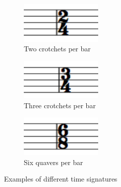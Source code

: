 \begin{figure}[h!]
    \begin{subfigure}[b]{.3\linewidth}
        \centering
        \includegraphics[height=2cm]{gfx/music-theory/time-signature-2-4.png}
        \caption{Two crotchets per bar}
    \end{subfigure}
    \begin{subfigure}[b]{.3\linewidth}
        \centering
        \includegraphics[height=2cm]{gfx/music-theory/time-signature-3-4.png}
        \caption{Three crotchets per bar}
    \end{subfigure}
    \begin{subfigure}[b]{.3\linewidth}
        \centering
        \includegraphics[height=2cm]{gfx/music-theory/time-signature-6-8.png}
        \caption{Six quavers per bar}
    \end{subfigure}

    \caption{Examples of different time signatures}
\end{figure}

